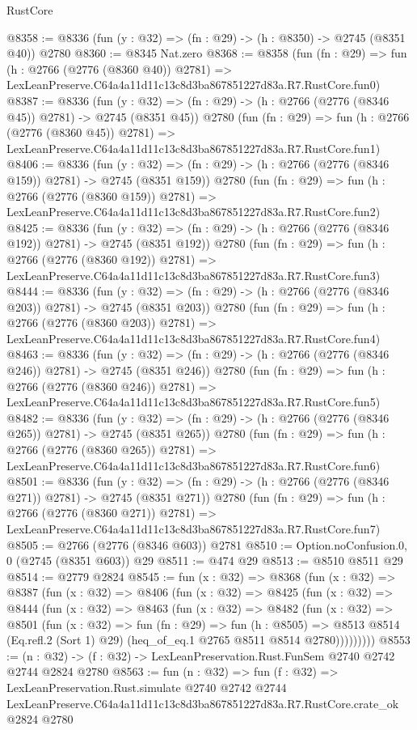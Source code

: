 \begin{lexlean}{RustCore}
\begin{coremodule}
@8358 := @8336 (fun (y : @32) => (fn : @29) -> (h : @8350) -> @2745 (@8351 @40)) @2780
@8360 := @8345 Nat.zero
@8368 := @8358
    (fun (fn : @29) =>
    fun (h : @2766 (@2776 (@8360 @40)) @2781) =>
    LexLeanPreserve.C64a4a11d11c13c8d3ba867851227d83a.R7.RustCore.fun0)
@8387 := @8336
    (fun (y : @32) => (fn : @29) -> (h : @2766 (@2776 (@8346 @45)) @2781) -> @2745 (@8351 @45))
    @2780
    (fun (fn : @29) =>
    fun (h : @2766 (@2776 (@8360 @45)) @2781) =>
    LexLeanPreserve.C64a4a11d11c13c8d3ba867851227d83a.R7.RustCore.fun1)
@8406 := @8336
    (fun (y : @32) => (fn : @29) -> (h : @2766 (@2776 (@8346 @159)) @2781) -> @2745 (@8351 @159))
    @2780
    (fun (fn : @29) =>
    fun (h : @2766 (@2776 (@8360 @159)) @2781) =>
    LexLeanPreserve.C64a4a11d11c13c8d3ba867851227d83a.R7.RustCore.fun2)
@8425 := @8336
    (fun (y : @32) => (fn : @29) -> (h : @2766 (@2776 (@8346 @192)) @2781) -> @2745 (@8351 @192))
    @2780
    (fun (fn : @29) =>
    fun (h : @2766 (@2776 (@8360 @192)) @2781) =>
    LexLeanPreserve.C64a4a11d11c13c8d3ba867851227d83a.R7.RustCore.fun3)
@8444 := @8336
    (fun (y : @32) => (fn : @29) -> (h : @2766 (@2776 (@8346 @203)) @2781) -> @2745 (@8351 @203))
    @2780
    (fun (fn : @29) =>
    fun (h : @2766 (@2776 (@8360 @203)) @2781) =>
    LexLeanPreserve.C64a4a11d11c13c8d3ba867851227d83a.R7.RustCore.fun4)
@8463 := @8336
    (fun (y : @32) => (fn : @29) -> (h : @2766 (@2776 (@8346 @246)) @2781) -> @2745 (@8351 @246))
    @2780
    (fun (fn : @29) =>
    fun (h : @2766 (@2776 (@8360 @246)) @2781) =>
    LexLeanPreserve.C64a4a11d11c13c8d3ba867851227d83a.R7.RustCore.fun5)
@8482 := @8336
    (fun (y : @32) => (fn : @29) -> (h : @2766 (@2776 (@8346 @265)) @2781) -> @2745 (@8351 @265))
    @2780
    (fun (fn : @29) =>
    fun (h : @2766 (@2776 (@8360 @265)) @2781) =>
    LexLeanPreserve.C64a4a11d11c13c8d3ba867851227d83a.R7.RustCore.fun6)
@8501 := @8336
    (fun (y : @32) => (fn : @29) -> (h : @2766 (@2776 (@8346 @271)) @2781) -> @2745 (@8351 @271))
    @2780
    (fun (fn : @29) =>
    fun (h : @2766 (@2776 (@8360 @271)) @2781) =>
    LexLeanPreserve.C64a4a11d11c13c8d3ba867851227d83a.R7.RustCore.fun7)
@8505 := @2766 (@2776 (@8346 @603)) @2781
@8510 := Option.noConfusion.{0, 0} (@2745 (@8351 @603)) @29
@8511 := @474 @29
@8513 := @8510 @8511 @29
@8514 := @2779 @2824
@8545 := fun (x : @32) =>
  @8368
    (fun (x : @32) =>
    @8387
      (fun (x : @32) =>
      @8406
        (fun (x : @32) =>
        @8425
          (fun (x : @32) =>
          @8444
            (fun (x : @32) =>
            @8463
              (fun (x : @32) =>
              @8482
                (fun (x : @32) =>
                @8501
                  (fun (x : @32) =>
                  fun (fn : @29) =>
                  fun (h : @8505) =>
                  @8513
                    @8514
                    (Eq.refl.{2} (Sort 1) @29)
                    (heq_of_eq.{1} @2765 @8511 @8514 @2780)))))))))
@8553 := (n : @32) -> (f : @32) -> LexLeanPreservation.Rust.FunSem @2740 @2742 @2744 @2824 @2780
@8563 := fun (n : @32) =>
  fun (f : @32) =>
  LexLeanPreservation.Rust.simulate
    @2740
    @2742
    @2744
    LexLeanPreserve.C64a4a11d11c13c8d3ba867851227d83a.R7.RustCore.crate_ok
    @2824
    @2780
\end{coremodule}
\end{lexlean}
